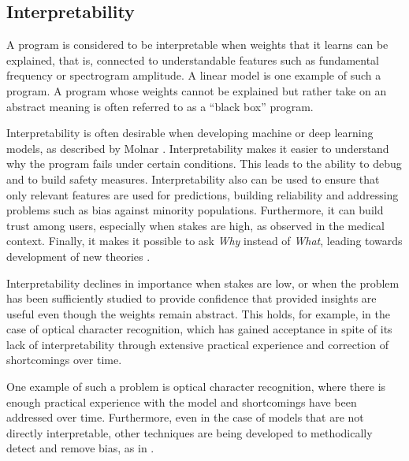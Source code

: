 \subsection{Interpretability}
\label{sec:interpretability}
A program is considered to be interpretable when weights that it learns can be explained, that is, connected to understandable features such as fundamental frequency or spectrogram amplitude. A linear model is one example of such a program. A program whose weights cannot be explained but rather take on an abstract meaning is often referred to as a ``black box'' program.

Interpretability is often desirable when developing machine or deep learning models, as described by Molnar \cite{molnar2020interpretable}. Interpretability makes it easier to understand why the program fails under certain conditions. This leads to the ability to debug and to build safety measures. Interpretability also can be used to ensure that only relevant features are used for predictions, building reliability and addressing problems such as bias against minority populations. Furthermore, it can build trust among users, especially when stakes are high, as observed in the medical context. Finally, it makes it possible to ask \textit{Why} instead of \textit{What}, leading towards development of new theories \cite{molnar2020interpretable}. 

Interpretability declines in importance when stakes are low, or when the problem has been sufficiently studied to provide confidence that provided insights are useful even though the weights remain abstract. This holds, for example, in the case of optical character recognition, which has gained acceptance in spite of its lack of interpretability through extensive practical experience and correction of shortcomings over time. 

One example of such a problem is optical character recognition, where there is enough practical experience with the model and shortcomings have been addressed over time. Furthermore, even in the case of models that are not directly interpretable, other techniques are being developed to methodically detect and remove bias, as in \cite{jiang2019identifying}.

